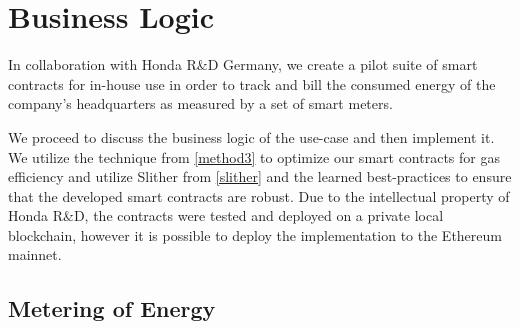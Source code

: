 
\section{Business Logic} \label{business-logic}
In collaboration with Honda R\&D Germany, we create a pilot suite of smart contracts for in-house use in order to track and bill the consumed energy of the company's headquarters as measured by a set of smart meters. 

We proceed to discuss the business logic of the use-case and then implement it. We utilize the technique from \ref{method3} to optimize our smart contracts for gas efficiency and utilize Slither from \ref{slither} and the learned best-practices to ensure that the developed smart contracts are robust. Due to the intellectual property of Honda R\&D, the contracts were tested and deployed on a private local blockchain, however it is possible to deploy the implementation to the Ethereum mainnet.



\subsection{Metering of Energy} \label{metering}

